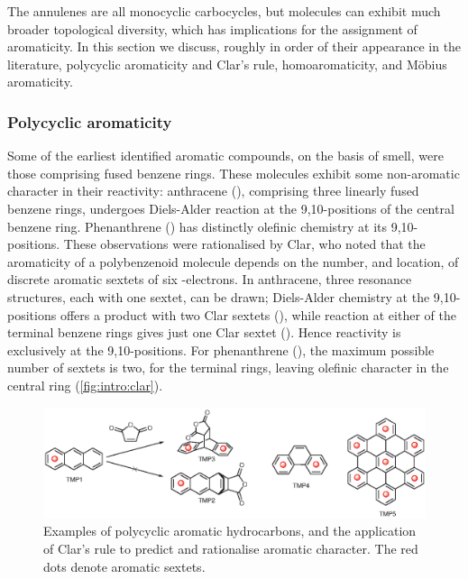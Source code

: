 		The annulenes are all monocyclic carbocycles, but molecules can exhibit much broader topological diversity, which has implications for the assignment of aromaticity. In this section we discuss, roughly in order of their appearance in the literature, polycyclic aromaticity and Clar's rule, homoaromaticity, and M\"obius aromaticity.

		\subsubsection{Polycyclic aromaticity}

			Some of the earliest identified aromatic compounds, on the basis of smell, were those comprising fused benzene rings. These molecules exhibit some non-aromatic character in their reactivity: anthracene (), comprising three linearly fused benzene rings, undergoes Diels-Alder reaction at the 9,10-positions of the central benzene ring. Phenanthrene () has distinctly olefinic chemistry at its 9,10-positions. These observations were rationalised by Clar, who noted that the aromaticity of a polybenzenoid molecule depends on the number, and location, of discrete aromatic sextets of six \pii{}-electrons.\autocite{clar1972aromatic} In anthracene, three resonance structures, each with one sextet, can be drawn; Diels-Alder chemistry at the 9,10-positions offers a product with two Clar sextets (), while reaction at either of the terminal benzene rings gives just one Clar sextet (). Hence reactivity is exclusively at the 9,10-positions. For phenanthrene (), the maximum possible number of sextets is two, for the terminal rings, leaving olefinic character in the central ring (\autoref{fig:intro:clar}).\autocite{Sola2013}



			\begin{figure}[ht!]
				\centering\includegraphics{figures/intro/clar.eps} 
				\caption[]{Examples of polycyclic aromatic hydrocarbons, and the application of Clar's rule to predict and rationalise aromatic character. The red dots denote aromatic sextets.}
				\label{fig:intro:clar}
			\end{figure}

